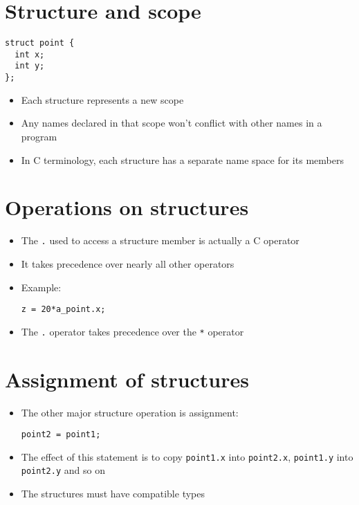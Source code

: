 \documentclass{article}
\begin{document}
\section{Structure and scope}
\begin{verbatim}
struct point {
  int x;
  int y;
};
\end{verbatim}

\begin{itemize}
\item Each structure represents a new scope

\item Any names declared in that scope won't conflict with other names in a program

\item In C terminology, each structure has a separate name space for its members
\end{itemize}



\section{Operations on structures}
\begin{itemize}
\item The \verb!.! used to access a structure member is actually a C operator
\item It takes precedence over nearly all other operators
\item Example:

\begin{verbatim}
z = 20*a_point.x;
\end{verbatim}

\item The \verb!.! operator takes precedence over the \verb!*! operator
\end{itemize}



\section{Assignment of structures}
\begin{itemize}
\item The other major structure operation is assignment:
\begin{verbatim}
point2 = point1;
\end{verbatim}

\item The effect of this statement is to copy \verb!point1.x! into \verb!point2.x!, \verb!point1.y! into \verb!point2.y! and so on

\item The structures must have compatible types

\end{itemize}
\end{document}
